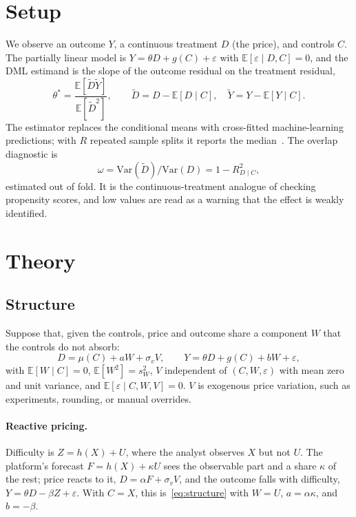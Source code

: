 \documentclass[11pt]{article}
\theoremstyle{remark}
\newcommand{\E}{\mathbb{E}}
\newcommand{\Var}{\mathrm{Var}}
\begin{document}
\section{Setup}
\label{sec:setup}

We observe an outcome $Y$, a continuous treatment $D$ (the price), and controls $C$. The partially linear model is $Y = \theta D + g(C) + \varepsilon$ with $\E[\varepsilon \mid D, C] = 0$, and the DML estimand is the slope of the outcome residual on the treatment residual,
\begin{equation}
\theta^\ast = \frac{\E[\tilde D \tilde Y]}{\E[\tilde D^2]}, \qquad \tilde D = D - \E[D \mid C], \quad \tilde Y = Y - \E[Y \mid C].
\label{eq:estimand}
\end{equation}
The estimator replaces the conditional means with cross-fitted machine-learning predictions; with $R$ repeated sample splits it reports the median~\citep{chernozhukov2018}. The overlap diagnostic is
\begin{equation}
\omega = \Var(\tilde D) / \Var(D) = 1 - R^2_{D \mid C},
\label{eq:overlap}
\end{equation}
estimated out of fold. It is the continuous-treatment analogue of checking propensity scores, and low values are read as a warning that the effect is weakly identified.

\section{Theory}
\label{sec:theory}

\subsection{Structure}

Suppose that, given the controls, price and outcome share a component $W$ that the controls do not absorb:
\begin{equation}
D = \mu(C) + aW + \sigma_v V, \qquad Y = \theta D + g(C) + bW + \varepsilon,
\label{eq:structure}
\end{equation}
with $\E[W \mid C] = 0$, $\E[W^2] = s_W^2$, $V$ independent of $(C, W, \varepsilon)$ with mean zero and unit variance, and $\E[\varepsilon \mid C, W, V] = 0$. $V$ is exogenous price variation, such as experiments, rounding, or manual overrides.

\paragraph{Reactive pricing.} Difficulty is $Z = h(X) + U$, where the analyst observes $X$ but not $U$. The platform's forecast $F = h(X) + \kappa U$ sees the observable part and a share $\kappa$ of the rest; price reacts to it, $D = \alpha F + \sigma_v V$, and the outcome falls with difficulty, $Y = \theta D - \beta Z + \varepsilon$. With $C = X$, this is~\eqref{eq:structure} with $W = U$, $a = \alpha\kappa$, and $b = -\beta$.
\end{document}
